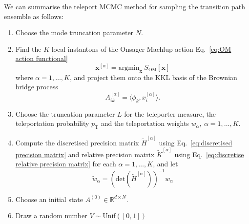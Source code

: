 We can summarise the teleport MCMC method for sampling the transition path ensemble as follows:
\begin{enumerate}
	\item Choose the mode truncation parameter $N$.

	\item Find the $K$ local instantons of the Onsager-Machlup action Eq.~\ref{eq:OM action functional}
		\begin{equation}
			\mathbf{x}^{[\alpha]} = \text{argmin}_{\mathbf{x}}\ S_\text{OM}[\mathbf{x}]
		\end{equation}
		where $\alpha = 1,\dots,K$, and project them onto the KKL basis of the Brownian bridge process
		\begin{equation}
			A_{ik}^{[\alpha]} = \langle \phi_k, x_i^{[\alpha]} \rangle.
		\end{equation}
	
	\item Choose the truncation parameter $L$ for the teleporter measure, the teleportation probability $p_\text{T}$ and the teleportation weights $w_\alpha,\ \alpha=1,\dots,K$.
	
	\item Compute the discretised precision matrix $\tilde{H}^{[\alpha]}$ using Eq.~\ref{eq:discretised precision matrix} and relative precision matrix $\tilde{K}^{[\alpha]}$ using Eq.~\ref{eq:discretise relative precision matrix} for each $\alpha = 1,\dots,K$, and let
		\begin{equation}
			\tilde{w}_\alpha = (\text{det}( \tilde{H}^{[\alpha]} ))^{-1} w_\alpha 
		\end{equation}
	
	\item Choose an initial state $A^{(0)} \in \mathbb{R}^{d \times N}$.
	
	\item Draw a random number $V \sim \text{Unif}([0,1])$
	

\end{enumerate}
